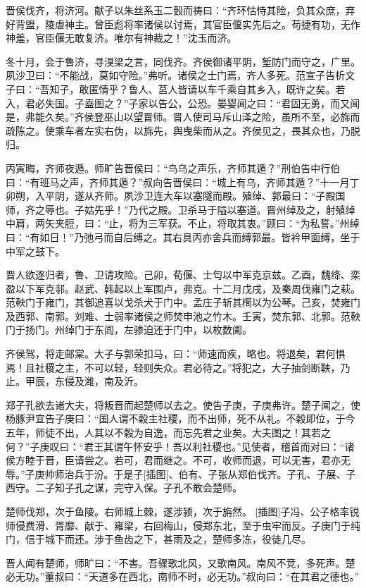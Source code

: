 \documentclass[a4paper,12pt,UTF8,twoside]{ctexbook}
\begin{document}
晋侯伐齐，将济河。献子以朱丝系玉二瑴而祷曰：“齐环怙恃其险，负其众庶，弃好背盟，陵虐神主。曾臣彪将率诸侯以讨焉，其官臣偃实先后之。苟捷有功，无作神羞，官臣偃无敢复济。唯尔有神裁之！”沈玉而济。

冬十月，会于鲁济，寻湨梁之言，同伐齐。齐侯御诸平阴，堑防门而守之，广里。夙沙卫曰：“不能战，莫如守险。”弗听。诸侯之士门焉，齐人多死。范宣子告析文子曰：“吾知子，敢匿情乎？鲁人、莒人皆请以车千乘自其乡入，既许之矣。若入，君必失国。子盍图之？”子家以告公，公恐。晏婴闻之曰：“君固无勇，而又闻是，弗能久矣。”齐侯登巫山以望晋师。晋人使司马斥山泽之险，虽所不至，必旆而疏陈之。使乘车者左实右伪，以旆先，舆曳柴而从之。齐侯见之，畏其众也，乃脱归。

丙寅晦，齐师夜遁。师旷告晋侯曰：“鸟乌之声乐，齐师其遁？”刑伯告中行伯曰：“有班马之声，齐师其遁？”叔向告晋侯曰：“城上有乌，齐师其遁？”十一月丁卯朔，入平阴，遂从齐师。夙沙卫连大车以塞隧而殿。殖绰、郭最曰：“子殿国师，齐之辱也。子姑先乎！”乃代之殿。卫杀马于隘以塞道。晋州绰及之，射殖绰中肩，两矢夹脰，曰：“止，将为三军获。不止，将取其衷。”顾曰：“为私誓。”州绰曰：“有如日！”乃弛弓而自后缚之。其右具丙亦舍兵而缚郭最。皆衿甲面缚，坐于中军之鼓下。

晋人欲逐归者，鲁、卫请攻险。己卯，荀偃、士匄以中军克京兹。乙酉，魏绛、栾盈以下军克邿。赵武、韩起以上军围卢，弗克。十二月戊戌，及秦周伐雍门之萩。范鞅门于雍门，其御追喜以戈杀犬于门中。孟庄子斩其橁以为公琴。己亥，焚雍门及西郭、南郭。刘难、士弱率诸侯之师焚申池之竹木。壬寅，焚东郭、北郭。范鞅门于扬门。州绰门于东闾，左骖迫还于门中，以枚数阖。

齐侯驾，将走邮棠。大子与郭荣扣马，曰：“师速而疾，略也。将退矣，君何惧焉！且社稷之主，不可以轻，轻则失众。君必待之。”将犯之，大子抽剑断鞅，乃止。甲辰，东侵及潍，南及沂。

郑子孔欲去诸大夫，将叛晋而起楚师以去之。使告子庚，子庚弗许。楚子闻之，使杨豚尹宜告子庚曰：“国人谓不穀主社稷，而不出师，死不从礼。不穀即位，于今五年，师徒不出，人其以不穀为自逸，而忘先君之业矣。大夫图之！其若之何？”子庚叹曰：“君王其谓午怀安乎！吾以利社稷也。”见使者，稽首而对曰：“诸侯方睦于晋，臣请尝之。若可，君而继之。不可，收师而退，可以无害，君亦无辱。”子庚帅师治兵于汾。于是子[插图]、伯有、子张从郑伯伐齐。子孔、子展、子西守。二子知子孔之谋，完守入保。子孔不敢会楚师。

楚师伐郑，次于鱼陵。右师城上棘，遂涉颍，次于旃然。 [插图]子冯、公子格率锐师侵费滑、胥靡、献于、雍梁，右回梅山，侵郑东北，至于虫牢而反。子庚门于纯门，信于城下而还。涉于鱼齿之下，甚雨及之，楚师多冻，役徒几尽。

晋人闻有楚师，师旷曰：“不害。吾骤歌北风，又歌南风。南风不竞，多死声。楚必无功。”董叔曰：“天道多在西北，南师不时，必无功。”叔向曰：“在其君之德也。”
\end{document}
